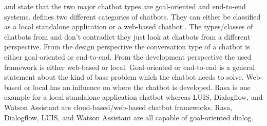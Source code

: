 \citet{williams2017hybrid} and \citet{bordes2016learning} state that the two major chatbot types are goal-oriented and end-to-end systems.
\citet{kane2016role} defines two different categories of chatbots.
They can either be classified as a local standalone application or a web-based chatbot \cite{kane2016role}.
The types/classes of chatbots from \citet{williams2017hybrid, bordes2016learning} and \citet{kane2016role} 
don't contradict they just look at chatbots from a different perspective.
From the design perspective the conversation type of a chatbot is either goal-oriented or end-to-end.
From the development perspective the used framework is either web-based or local.
Goal-oriented or end-to-end is a general statement about the kind of base problem 
which the chatbot needs to solve.
Web-based or local has an influence on where the chatbot is developed.
Rasa is one example for a local standalone application chatbot whereas LUIS, 
Dialogflow, and Watson Assistant are cloud-based/web-based chatbot frameworks.
Rasa, Dialogflow, LUIS, and Watson Assistant are all capable of goal-oriented dialog.


